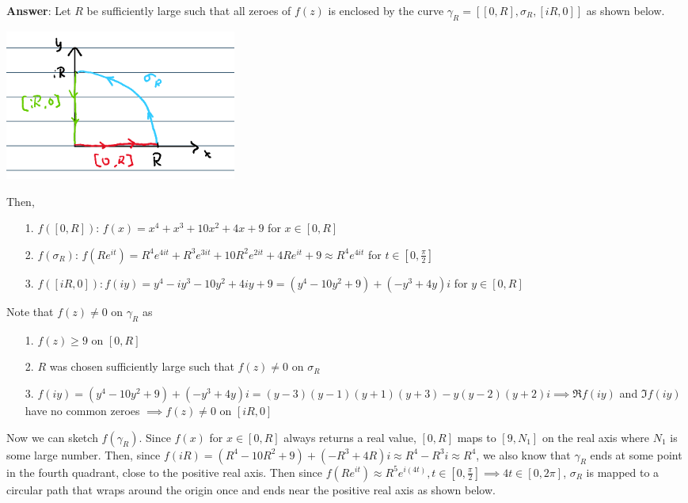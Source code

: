 \documentclass{article}
\begin{document}
\begin{itemize}
            \textbf{Answer}: Let $R$ be sufficiently large such that all zeroes of $f(z)$ is enclosed by the curve $\gamma_R=[[0,R],\sigma_R,[iR,0]]$ as shown below.
            \begin{center}
                  \includegraphics[width=3in]{p2-1.png}
            \end{center}
            Then,
            \begin{itemize}
                  \item [1.] $f([0,R])$: $f(x)=x^4+x^3+10x^2+4x+9$ for $x\in[0,R]$
                  \item [2.] $f(\sigma_R)$: $f(Re^{it})=R^4e^{4it}+R^3e^{3it}+10R^2e^{2it}+4Re^{it}+9\approx R^4e^{4it}$ for $t\in[0,\frac{\pi}{2}]$
                  \item [3.] $f([iR,0]): f(iy)=y^4-iy^3-10y^2+4iy+9=(y^4-10y^2+9)+(-y^3+4y)i$ for $y\in[0,R]$
            \end{itemize}
            Note that $f(z)\neq 0$ on $\gamma_R$ as
            \begin{itemize}
                  \item [1.] $f(z)\geq 9$ on $[0,R]$
                  \item [2.] $R$ was chosen sufficiently large such that $f(z)\neq 0$ on $\sigma_R$
                  \item [3.] $f(iy)=(y^4-10y^2+9)+(-y^3+4y)i=(y-3)(y-1)(y+1)(y+3)-y(y-2)(y+2)i\implies\Re f(iy)$ and $\Im f(iy)$ have no common zeroes $\implies f(z)\neq 0$ on $[iR,0]$
            \end{itemize}
            Now we can sketch $f(\gamma_R)$. Since $f(x)$ for $x\in[0,R]$ always returns a real value, $[0,R]$ maps to $[9,N_1]$ on the real axis where $N_1$ is some large number. Then, since $f(iR)=(R^4-10R^2+9)+(-R^3+4R)i\approx R^4-R^3i\approx R^4$, we also know that $\gamma_R$ ends at some point in the fourth quadrant, close to the positive real axis. Then since $f(Re^{it})\approx R^5e^{i(4t)},t\in[0,\frac{\pi}{2}]\implies 4t\in[0,2\pi]$, $\sigma_R$ is mapped to a circular path that wraps around the origin once and ends near the positive real axis as shown below.

\end{itemize}
\end{document}
